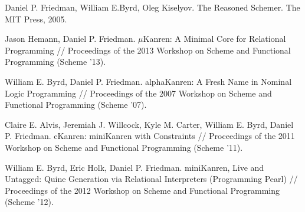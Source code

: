 \documentclass{llncs}
\begin{document}
\begin{thebibliography}{99}
Daniel P. Friedman, William E.Byrd, Oleg Kiselyov. The Reasoned Schemer. The MIT
Press, 2005.

Jason Hemann, Daniel P. Friedman. $\mu$Kanren: A Minimal Core for Relational Programming //
Proceedings of the 2013 Workshop on Scheme and Functional Programming (Scheme '13).

William E. Byrd, Daniel P. Friedman. alphaKanren: A Fresh Name in Nominal Logic Programming //
Proceedings of the 2007 Workshop on Scheme and Functional Programming (Scheme '07).

Claire E. Alvis, Jeremiah J. Willcock, Kyle M. Carter, William E. Byrd, Daniel P. Friedman.
cKanren: miniKanren with Constraints //
Proceedings of the 2011 Workshop on Scheme and Functional Programming (Scheme '11).

William E. Byrd, Eric Holk, Daniel P. Friedman.
miniKanren, Live and Untagged: Quine Generation via Relational Interpreters (Programming Pearl) //
Proceedings of the 2012 Workshop on Scheme and Functional Programming (Scheme '12).










\end{thebibliography}
\end{document}
